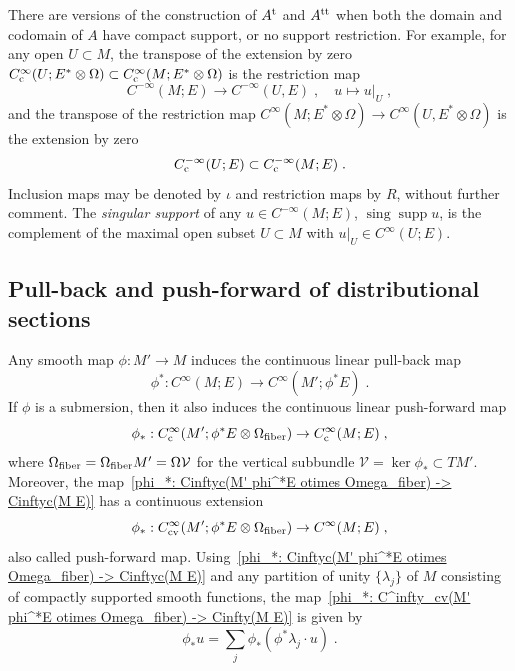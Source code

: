 \documentclass{memo-l}
\theoremstyle{plain}
\theoremstyle{definition}
\theoremstyle{remark}
\newcommand{\VV}{\mathcal{V}}
\newcommand{\supp}{\operatorname{supp}}
\newcommand{\sing}{\operatorname{sing}}
\newcommand{\fiber}{{\text{\rm fiber}}}
\newcommand{\co}{{\text{\rm c}}}
\newcommand{\cv}{{\text{\rm cv}}}
\newcommand{\trans}{{\text{\rm t}}}
\newcommand{\Cinftyc}{C^\infty_{\text{\rm c}}}
\numberwithin{section}{chapter}
\numberwithin{equation}{section}%
\begin{document}
There are versions of the construction of $A^\trans$ and $A^{\text{\rm tt}}$ when both the domain and codomain of $A$ have compact support, or no support restriction. For example, for any open $U\subset M$, the transpose of the extension by zero $\Cinftyc(U;E^*\otimes\Omega)\subset\Cinftyc(M;E^*\otimes\Omega)$ is the restriction map
\begin{equation}\label{restriction map}
C^{-\infty}(M;E)\to C^{-\infty}(U,E)\;,\quad u\mapsto u|_U\;,
\end{equation}
and the transpose of the restriction map $C^\infty(M;E^*\otimes\Omega)\to C^\infty(U,E^*\otimes\Omega)$ is the extension by zero
\begin{equation}\label{ext by 0}
C^{-\infty}_\co(U;E)\subset C^{-\infty}_\co(M;E)\;.
\end{equation}
Inclusion maps may be denoted by $\iota$ \index{$\iota$} and restriction maps by $R$,  without further comment. The \emph{singular support} of any $u\in C^{-\infty}(M;E)$, $\sing\supp u$, is the complement of the maximal open subset $U\subset M$ with $u|_U\in C^\infty(U;E)$.



\subsection{Pull-back and push-forward of distributional sections}
\label{ss: pull-back and push-forward of distrib sections}

Any smooth map $\phi:M'\to M$ induces the continuous linear pull-back map
\begin{equation}\label{phi^*: C^infty(M E) -> C^infty(M' phi^*E)}
\phi^*:C^\infty(M;E)\to C^\infty(M';\phi^*E)\;.
\end{equation}
If $\phi$ is a submersion, then it also induces the continuous linear push-forward map
\begin{equation}\label{phi_*: Cinftyc(M' phi^*E otimes Omega_fiber) -> Cinftyc(M E)}
\phi_*:\Cinftyc(M';\phi^*E\otimes\Omega_\fiber)\to \Cinftyc(M;E)\;,
\end{equation}
where $\Omega_\fiber=\Omega_\fiber M'=\Omega\VV$ \index{$\Omega_\fiber$} for the vertical subbundle $\VV=\ker\phi_*\subset TM'$. Moreover, the map~\eqref{phi_*: Cinftyc(M' phi^*E otimes Omega_fiber) -> Cinftyc(M E)} has a continuous extension
\begin{equation}\label{phi_*: C^infty_cv(M' phi^*E otimes Omega_fiber) -> Cinfty(M E)}
\phi_*:C^\infty_\cv(M';\phi^*E\otimes\Omega_\fiber)\to C^\infty(M;E)\;,
\end{equation}
also called push-forward map. Using~\eqref{phi_*: Cinftyc(M' phi^*E otimes Omega_fiber) -> Cinftyc(M E)} and any partition of unity $\{\lambda_j\}$ of $M$ consisting of compactly supported smooth functions, the map~\eqref{phi_*: C^infty_cv(M' phi^*E otimes Omega_fiber) -> Cinfty(M E)} is given by
\begin{equation}\label{phi_*u}
\phi_*u=\sum_j\phi_*(\phi^*\lambda_j\cdot u)\;.
\end{equation}
\end{document}
